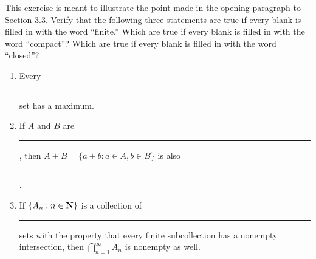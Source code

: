 \documentclass{lew98_solutions}
\begin{document}
\begin{exercise}
\label{ex:3.3.6}
    This exercise is meant to illustrate the point made in the opening paragraph to Section 3.3. Verify that the following three statements are true if every blank is filled in with the word ``finite.'' Which are true if every blank is filled in with the word ``compact''? Which are true if every blank is filled in with the word ``closed''?
    \begin{enumerate}
        \item Every \rule{1cm}{0.15mm} set has a maximum.

        \item If \( A \) and \( B \) are \rule{1cm}{0.15mm}, then \( A + B = \{ a + b : a \in A, b \in B \} \) is also \rule{1cm}{0.15mm}.

        \item If \( \{ A_n : n \in \mathbf{N} \} \) is a collection of \rule{1cm}{0.15mm} sets with the property that every finite subcollection has a nonempty intersection, then \( \bigcap_{n=1}^{\infty} A_n \) is nonempty as well.
    \end{enumerate}
\end{exercise}
\end{document}
